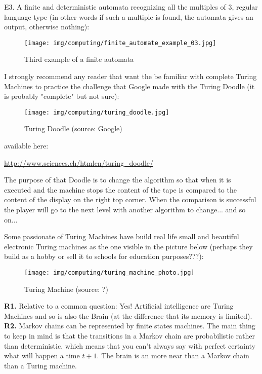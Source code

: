 	\begin{tcolorbox}[colframe=black,colback=white,sharp corners]
	E3.  A finite and deterministic automata recognizing all the multiples of $3$, regular language type (in other words if such a multiple is found, the automata gives an output, otherwise nothing):
	\begin{figure}[H]
		\centering
		\texttt{[image: img/computing/finite\_automate\_example\_03.jpg]}
		\caption{Third example of a finite automata}
	\end{figure}
	\end{tcolorbox}
	I strongly recommend any reader that want the be familiar with complete Turing Machines to practice the challenge that Google made with the Turing Doodle (it is probably "complete" but not sure):
	\begin{figure}[H]
		\centering
		\texttt{[image: img/computing/turing\_doodle.jpg]}
		\caption[]{Turing Doodle (source: Google)}
	\end{figure}
	available here:
	\begin{center}
		\url{http://www.sciences.ch/htmlen/turing_doodle/}
	\end{center}
	The purpose of that Doodle is to change the algorithm so that when it is executed and the machine stops the content of the tape is compared to the content of the display on the right top corner. When the comparison is successful the player will go to the next level with another algorithm to change... and so on...
	
	Some passionate of Turing Machines have build real life small and beautiful electronic Turing machines as the one visible in the picture below (perhaps they build as a hobby or sell it to schools for education purposes???):
	\begin{figure}[H]
		\centering
		\texttt{[image: img/computing/turing\_machine\_photo.jpg]}
		\caption[Turing Machine]{Turing Machine (source: ?)}
	\end{figure}
	\begin{tcolorbox}[title=Remarks,colframe=black,arc=10pt]
	\textbf{R1.} Relative to a common question: Yes! Artificial intelligence are Turing Machines and so is also the Brain (at the difference that its memory is limited).\\
	
	\textbf{R2.} Markov chains can be represented by finite states machines. The main thing to keep in mind is that the transitions in a Markov chain are probabilistic rather than deterministic. which means that you can't always say with perfect certainty what will happen a time $t+1$. The brain is an more near than a Markov chain than a Turing machine.
	\end{tcolorbox}
	
